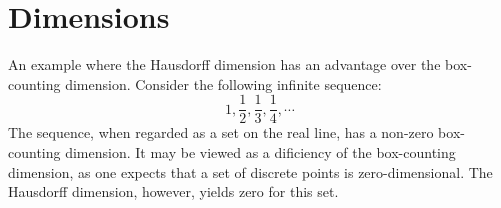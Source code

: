 \documentclass[11pt]{book}
\begin{document}
\section{Dimensions}

An example where the Hausdorff dimension has an advantage over the box-counting dimension.
Consider the following infinite sequence:
\begin{equation*}
  1, \frac{1}{2}, \frac{1}{3}, \frac{1}{4}, \cdots
\end{equation*}
The sequence, when regarded as a set on the real line, has a non-zero box-counting dimension.
It may be viewed as a dificiency of the box-counting dimension, as one expects that
a set of discrete points is zero-dimensional.
The Hausdorff dimension, however, yields zero for this set.
 
\end{document}

